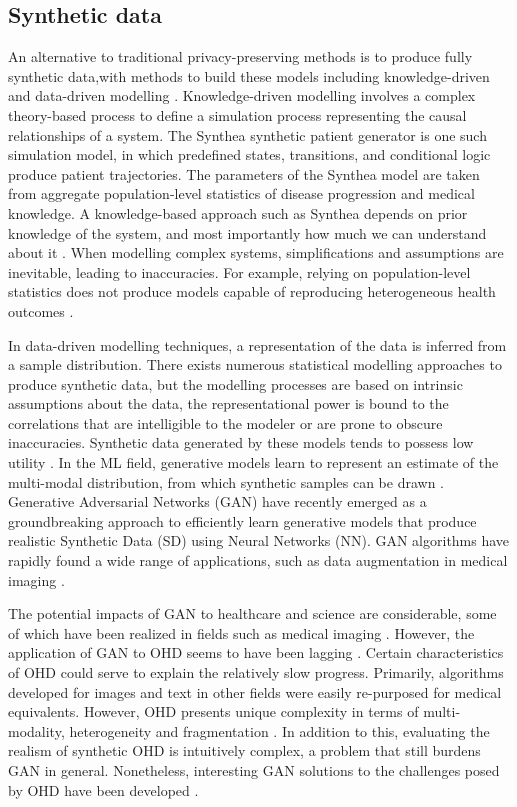 \subsection{Synthetic data}
An alternative to traditional privacy-preserving methods is to produce fully synthetic data,with methods to build these models including knowledge-driven and data-driven modelling \cite{Kim_2017}. Knowledge-driven modelling involves a complex theory-based process to define a simulation process representing the causal relationships of a system. The Synthea \cite{Walonoski_2017} synthetic patient generator is one such simulation model, in which predefined states, transitions, and conditional logic produce patient trajectories. The parameters of the Synthea model are taken from aggregate population-level statistics of disease progression and medical knowledge. A knowledge-based approach such as Synthea depends on prior knowledge of the system, and most importantly how much we can understand about it \cite{Kim_2017}. When modelling complex systems, simplifications and assumptions are inevitable, leading to inaccuracies. For example, relying on population-level statistics does not produce models capable of reproducing heterogeneous health outcomes \cite{Chen_2019}.\par
In data-driven modelling techniques, a representation of the data is inferred from a sample distribution. There exists numerous statistical modelling approaches to produce synthetic data, but the modelling processes are based on intrinsic assumptions about the data, the representational power is bound to the correlations that are intelligible to the modeler or are prone to obscure inaccuracies. Synthetic data generated by these models tends to possess low utility \cite{Rankin2020}. In the ML field, generative models learn to represent an estimate of the multi-modal distribution, from which synthetic samples can be drawn \cite{goodfellow2016nips}. Generative Adversarial Networks (GAN) \cite{NIPS2014_5423} have recently emerged as a groundbreaking approach to efficiently learn generative models that produce realistic Synthetic Data (SD) using Neural Networks (NN). GAN algorithms have rapidly found a wide range of applications, such as data augmentation in medical imaging \cite{Kadurin_2017}.\par
The potential impacts of GAN to healthcare and science are considerable, some of which have been realized in fields such as medical imaging \cite{Yi_2019}. However, the application of GAN to OHD seems to have been lagging \cite{Xiao_2018}. Certain characteristics of OHD could serve to explain the relatively slow progress. Primarily, algorithms developed for images and text in other fields were easily re-purposed for medical equivalents. However, OHD presents unique complexity in terms of multi-modality, heterogeneity and fragmentation \cite{Xiao_2018}. In addition to this, evaluating the realism of synthetic OHD is intuitively complex, a problem that still burdens GAN in general. Nonetheless, interesting GAN solutions to the challenges posed by OHD have been developed \cite{esteban2017real,Che_2017,choi2017generating,yahi2017generative}.
